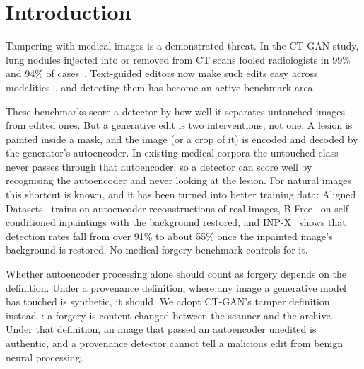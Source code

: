 \section{Introduction}
\label{sec:intro}

Tampering with medical images is a demonstrated threat.
In the CT-GAN study, lung nodules injected into or removed from CT scans fooled radiologists in 99\% and 94\% of cases~\cite{mirsky2019ctgan}. %
Text-guided editors now make such edits easy across modalities~\cite{medbanana2025,chen2026medforge}, and detecting them has become an active benchmark area~\cite{zingarini2024m3dsynth,grabovski2025btd,li2025medforensics,chen2026medforge}.

These benchmarks score a detector by how well it separates untouched images from edited ones.
But a generative edit is two interventions, not one.
A lesion is painted inside a mask, and the image (or a crop of it) is encoded and decoded by the generator's autoencoder.
In existing medical corpora the untouched class never passes through that autoencoder, so a detector can score well by recognising the autoencoder and never looking at the lesion.
For natural images this shortcut is known, and it has been turned into better training data: Aligned Datasets~\cite{rajan2025aligned} trains on autoencoder reconstructions of real images, B-Free~\cite{guillaro2025bfree} on self-conditioned inpaintings with the background restored, and INP-X~\cite{nebioglu2026inpx} shows that detection rates fall from over 91\% to about 55\% once the inpainted image's background is restored. %
No medical forgery benchmark controls for it.

Whether autoencoder processing alone should count as forgery depends on the definition.
Under a provenance definition, where any image a generative model has touched is synthetic, it should.
We adopt CT-GAN's tamper definition instead~\cite{mirsky2019ctgan}: a forgery is content changed between the scanner and the archive.
Under that definition, an image that passed an autoencoder unedited is authentic, and a provenance detector cannot tell a malicious edit from benign neural processing.

